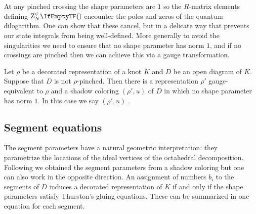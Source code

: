 \documentclass[margincite, leqno]{sl2art}
\numberwithin{equation}{section}
\begin{document}
At any pinched crossing the shape parameters are \(1\) so the
\(R\)-matrix elements defining \(\qinv{}\) encounter the poles and
zeros of the quantum dilogarithm.
One can show that these cancel, but in a delicate way that prevents
our state integrals from being well-defined.
More generally to avoid the singularities we need to ensure that no
shape parameter has norm \(1\), and if no crossings are pinched then
we can achieve this via a gauge transformation.

\begin{lemma}
  \label{thm:avoid unit circle}
  Let \(\rho\) be a decorated representation of a knot \(K\) and
  \(D\) be an open diagram of \(K\).
  Suppose that \(D\) is not \(\rho\)-pinched.
  Then there is a representation \(\rho'\) gauge-equivalent to
  \(\rho\) and a shadow coloring \((\rho', u)\) of \(D\) in which  no
  shape parameter has norm \(1\).
  In this case we say \((\rho', u)\) .
\end{lemma}

\subsection{Segment equations}%
\label{sec:Segment equations}

The segment parameters have a natural geometric
interpretation: they parametrize the locations of the ideal vertices
of the octahedral decomposition.
Following
\cite{McphailSnyder2024octahedralcoordinateswirtingerpresentation} we
obtained the segment parameters from a shadow coloring
but one can also work in the opposite direction.
An assignment of numbers \(b_{i}\) to the segments of \(D\) induces a
decorated representation of \(K\) if and only if the shape parameters
satisfy Thurston's gluing equations.
These can be summarized in one equation for each segment.
\end{document}
